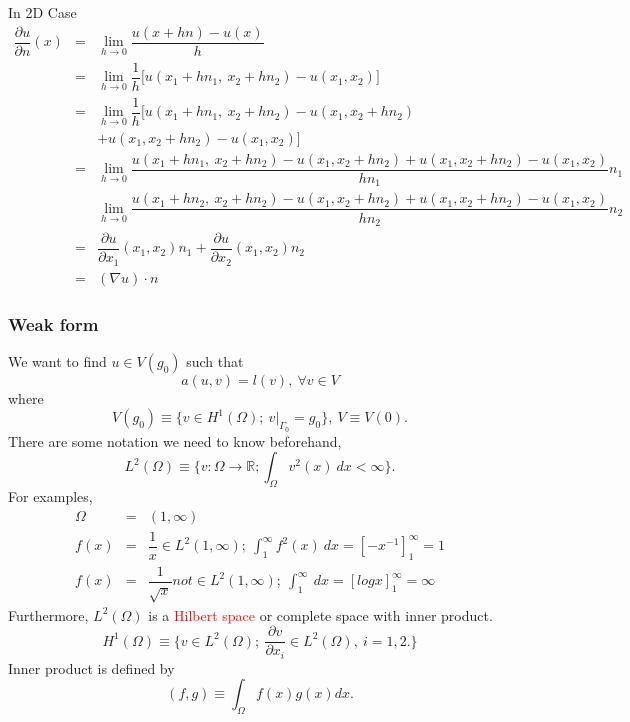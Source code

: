 \documentclass[a4paper,10pt]{article}
\begin{document}
\vspace{3cm}

In 2D Case
\begin{eqnarray}\nonumber
\dfrac{\partial u}{\partial n}(x) &=& \lim\limits_{h \rightarrow 0} \dfrac{u(x+hn)-u(x)}{h} \\ \nonumber
&=& \lim\limits_{h \rightarrow 0} \dfrac{1}{h} \big[ u(x_{1}+hn_{1}, \ x_{2}+hn_{2}) - u(x_{1},x_{2}) \big] \\ \nonumber
&=& \lim\limits_{h \rightarrow 0} \dfrac{1}{h} \big[ u(x_{1}+hn_{1}, \ x_{2}+hn_{2}) - u(x_{1},x_{2}+hn_{2}) \\ \nonumber
& &+ u(x_{1},x_{2}+hn_{2}) - u(x_{1},x_{2})  \big] \\ \nonumber
&=& \lim\limits_{h \rightarrow 0} \dfrac{u(x_{1}+hn_{1}, \ x_{2}+hn_{2}) - u(x_{1},x_{2}+hn_{2})+ u(x_{1},x_{2}+hn_{2}) - u(x_{1},x_{2})}{hn_{1}} n_{1} \\ \nonumber
& & \lim\limits_{h \rightarrow 0} \dfrac{u(x_{1}+hn_{2}, \ x_{2}+hn_{2}) - u(x_{1},x_{2}+hn_{2})+ u(x_{1},x_{2}+hn_{2}) - u(x_{1},x_{2})}{hn_{2}} n_{2} \\ \nonumber
&=& \dfrac{\partial u}{\partial x_{1}} (x_{1},x_{2}) n_{1} + \dfrac{\partial u}{\partial x_{2}} (x_{1},x_{2})n_{2} \\ \nonumber
&=& (\nabla u) \cdot n
\end{eqnarray}

\subsubsection{Weak form}
We want to find $ u \in V(g_{0}) $ such that
\begin{equation*}
a(u,v) = l(v) , \ \forall v \in V
\end{equation*}
where 
\begin{equation*}
V(g_{0}) \equiv \{ v \in H^{1}(\Omega) ; \ v|_{\Gamma_{0}}=g_{0} \}, \ V \equiv V(0).
\end{equation*}
There are some notation we need to know beforehand,
\begin{equation*}
L^{2}(\Omega) \equiv \{ v : \Omega \rightarrow \mathbb{R} ; \int_{\Omega} v^{2}(x) \ dx < \infty \}.
\end{equation*}
For examples,
\begin{eqnarray}\nonumber
\Omega &=& (1,\infty) \\ \nonumber
f(x) &=& \dfrac{1}{x}　\in L^{2}(1, \infty) ; \ \int_{1}^{\infty} f^{2}(x) \ dx = [ -x^{-1} ]^{\infty}_{1} =1 \\ \nonumber
f(x) &=& \dfrac{1}{\sqrt{x}} not \in L^{2}(1,\infty); \ \int_{1}^{\infty} \ dx = [log x]_{1}^{\infty} = \infty
\end{eqnarray}
Furthermore, $ L^2(\Omega) $ is a \textcolor{red}{Hilbert space} or complete space with inner product. 
\begin{equation*}
H^{1}(\Omega) \equiv \{ v \in L^2(\Omega); \ \dfrac{\partial v}{\partial x_{i}} \in L^2(\Omega), \ i=1,2. \}
\end{equation*}
Inner product is defined by
\[ (f,g) \equiv \int_{\Omega} f(x) g(x) dx. \]
\end{document}
